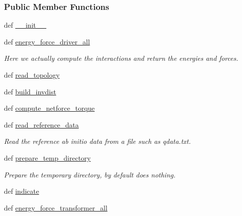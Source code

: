 \subsubsection*{Public Member Functions}
\begin{DoxyCompactItemize}
\item 
def \hyperlink{classforcebalance_1_1abinitio__internal_1_1AbInitio__Internal_a464ef514107b9aa56d4d3d4bf0a03821}{\-\_\-\-\_\-init\-\_\-\-\_\-}
\item 
def \hyperlink{classforcebalance_1_1abinitio__internal_1_1AbInitio__Internal_a289dc4371654f7e3278363597c906c7f}{energy\-\_\-force\-\_\-driver\-\_\-all}
\begin{DoxyCompactList}\small\item\em Here we actually compute the interactions and return the energies and forces. \end{DoxyCompactList}\item 
def \hyperlink{classforcebalance_1_1abinitio_1_1AbInitio_a9f405c452a0a4081cd7da07938520920}{read\-\_\-topology}
\item 
def \hyperlink{classforcebalance_1_1abinitio_1_1AbInitio_a7475857193eefd4edd020d4f2a8fec17}{build\-\_\-invdist}
\item 
def \hyperlink{classforcebalance_1_1abinitio_1_1AbInitio_afbf86c26158a68cae7460b4106809fdd}{compute\-\_\-netforce\-\_\-torque}
\item 
def \hyperlink{classforcebalance_1_1abinitio_1_1AbInitio_aa73bedbf1e2cf19f2fa1e88815f1bd86}{read\-\_\-reference\-\_\-data}
\begin{DoxyCompactList}\small\item\em Read the reference ab initio data from a file such as qdata.\-txt. \end{DoxyCompactList}\item 
def \hyperlink{classforcebalance_1_1abinitio_1_1AbInitio_a2d0f465f1988fd6bc611f7de4b59fd04}{prepare\-\_\-temp\-\_\-directory}
\begin{DoxyCompactList}\small\item\em Prepare the temporary directory, by default does nothing. \end{DoxyCompactList}\item 
def \hyperlink{classforcebalance_1_1abinitio_1_1AbInitio_a3260db78e8c174f04a64661c4e5c181c}{indicate}
\item 
def \hyperlink{classforcebalance_1_1abinitio_1_1AbInitio_a3d28520925c6dfd179647d0abf7e1368}{energy\-\_\-force\-\_\-transformer\-\_\-all}
\item 

\end{DoxyCompactItemize}
